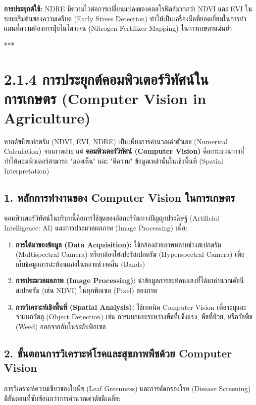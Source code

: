 \documentclass[11pt,a4paper,openany]{report}
\begin{document}
\textbf{การประยุกต์ใช้:}
NDRE มีความไวต่อการเปลี่ยนแปลงของคลอโรฟิลล์มากกว่า NDVI และ EVI ในระยะเริ่มต้นของความเครียด (Early Stress Detection) ทำให้เป็นเครื่องมือที่ยอดเยี่ยมในการทำแผนที่ความต้องการปุ๋ยไนโตรเจน (Nitrogen Fertilizer Mapping) ในการเกษตรแม่นยำ

***

\section{2.1.4 การประยุกต์คอมพิวเตอร์วิทัศน์ในการเกษตร (Computer Vision in Agriculture)}


หากดัชนีสเปกตรัม (NDVI, EVI, NDRE) เป็นเพียงการคำนวณค่าตัวเลข (Numerical Calculation) จากภาพถ่าย แต่ \textbf{คอมพิวเตอร์วิทัศน์ (Computer Vision)} คือกระบวนการที่ทำให้คอมพิวเตอร์สามารถ "มองเห็น" และ "ตีความ" ข้อมูลเหล่านั้นในเชิงพื้นที่ (Spatial Interpretation)

\subsection{1. หลักการทำงานของ Computer Vision ในการเกษตร}


คอมพิวเตอร์วิทัศน์ในบริบทนี้คือการใช้ชุดของอัลกอริทึมทางปัญญาประดิษฐ์ (Artificial Intelligence: AI) และการประมวลผลภาพ (Image Processing) เพื่อ:

\begin{enumerate}
  \item \textbf{การได้มาของข้อมูล (Data Acquisition):} ใช้กล้องถ่ายภาพหลายช่วงสเปกตรัม (Multispectral Camera) หรือกล้องไฮเปอร์สเปกตรัม (Hyperspectral Camera) เพื่อเก็บข้อมูลการสะท้อนแสงในหลายช่วงคลื่น (Bands)
  \item \textbf{การประมวลผลภาพ (Image Processing):} นำข้อมูลการสะท้อนแสงที่ได้มาคำนวณดัชนีสเปกตรัม (เช่น NDVI) ในทุกพิกเซล (Pixel) ของภาพ
  \item \textbf{การวิเคราะห์เชิงพื้นที่ (Spatial Analysis):} ใช้เทคนิค Computer Vision เพื่อระบุและจำแนกวัตถุ (Object Detection) เช่น การแยกแยะระหว่างพืชที่แข็งแรง, พืชที่ป่วย, หรือวัชพืช (Weed) ออกจากกันในระดับพิกเซล
\end{enumerate}


\subsection{2. ขั้นตอนการวิเคราะห์โรคและสุขภาพพืชด้วย Computer Vision}


การวิเคราะห์ความเขียวของใบพืช (Leaf Greenness) และการคัดกรองโรค (Disease Screening) มีขั้นตอนที่ซับซ้อนกว่าการคำนวณค่าดัชนีเฉลี่ย:
\end{document}
